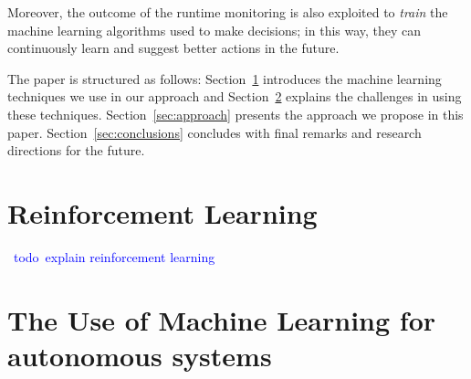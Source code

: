 \documentclass[sigconf,review, anonymous]{acmart}
\newcommand{\todo}[1]{\textcolor{blue}{\ding{46}~{\sf todo}~#1}}
\begin{document}

Moreover, the outcome of the runtime monitoring is also exploited to \emph{train} the machine learning algorithms used to make decisions; in this way, they can continuously learn and suggest better actions in the future.

The paper is structured as follows: Section~\ref{sec:reinforcementLearning} introduces the machine learning techniques we use in our approach and Section~\ref{sec:challenges} explains the challenges in using these techniques.  Section~\ref{sec:approach} presents the approach we propose in this paper.
Section~\ref{sec:conclusions} concludes with final remarks and research directions for the future. 

\section{Reinforcement Learning}\label{sec:reinforcementLearning}

\todo{explain reinforcement learning}

\section{The Use of Machine Learning for autonomous systems}\label{sec:challenges}
\end{document}

